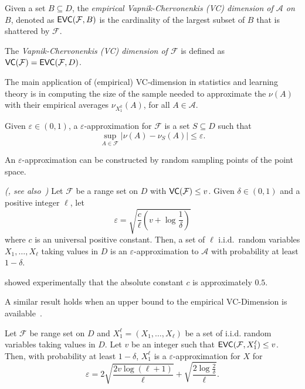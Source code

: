 \begin{definition}\label{def:empvcdim}
  Given a set $B\subseteq D$, the \emph{empirical Vapnik-Chervonenkis
  (VC) dimension of $\mathcal{A}$ on $B$}, denoted as $\mathsf{EVC}(\mathcal{F},B)$ is
  the cardinality of the largest subset of $B$ that is shattered by
  $\mathcal{F}$.
\end{definition}

\begin{definition}\label{def:vcdim}
  The \emph{Vapnik-Chervonenkis (VC) dimension of $\mathcal{F}$} is defined as
  $\mathsf{VC}(\mathcal{F})=\mathsf{EVC}(\mathcal{F},D)$.
\end{definition}

The main application of (empirical) VC-dimension in statistics and learning
theory is in computing the size of the sample needed to approximate the $\nu(A)$
with their empirical averages $\nu_{X_1^k}(A)$, for all $A\in\mathcal{A}$.

\begin{definition}\label{def:eapprox}
  Given $\varepsilon\in(0,1)$, a $\varepsilon$-approximation for $\mathcal{F}$
  is a set $S\subseteq D$ such that 
  \[
  \sup_{A\in\mathcal{F}}|\nu(A)-\nu_S(A)|\le\varepsilon.\]
\end{definition}

An $\varepsilon$-approximation can be constructed by random sampling points of
the point space.

\begin{theorem}\label{thm:eapprox}
  \emph{(\citep[Thm.~2.12]{HarPS11}, see also~\citep{LiLS01})}
  Let $\mathcal{F}$ be a range set on $D$ with $\mathsf{VC}(\mathcal{F})\le v$. Given
  $\delta\in(0,1)$ and a positive integer $\ell$, let
  \begin{equation}\label{eq:vceapprox}
    \varepsilon = \sqrt{\frac{c}{\ell}\left(v + \log\frac{1}{\delta}\right)}
  \end{equation}
  where $c$ is an universal positive constant. Then, a set of $\ell$
  i.i.d.~random variables $X_1,\dotsc,X_\ell$ taking values in $D$ is an
  $\varepsilon$-approximation to $\mathcal{A}$ with probability at least
  $1-\delta$.
\end{theorem}
\citet{LofflerP09} showed experimentally that the absolute
constant $c$ is approximately $0.5$.

A similar result holds when an upper bound to the empirical VC-Dimension is
available~\citep{BoucheronBL05}.
\begin{theorem}\label{thm:eapproxempir}
  Let $\mathcal{F}$ be range set on $D$ and
  $X_1^\ell=(X_1,\dotsc,X_\ell)$ be a set of i.i.d. random variables taking
  values in $D$. Let $v$ be an integer such that $\mathsf{EVC}(\mathcal{F},X_1^\ell)\le v$.
   Then, with probability at least $1-\delta$, $X_1^\ell$ is a
  $\varepsilon$-approximation for $X$ for 
  \begin{equation}\label{eq:evceapprox}
    \varepsilon =
    2\sqrt{\frac{2v\log(\ell+1)}{\ell}}+\sqrt{\frac{2\log\frac{2}{\delta}}{\ell}}.
  \end{equation}
\end{theorem}


